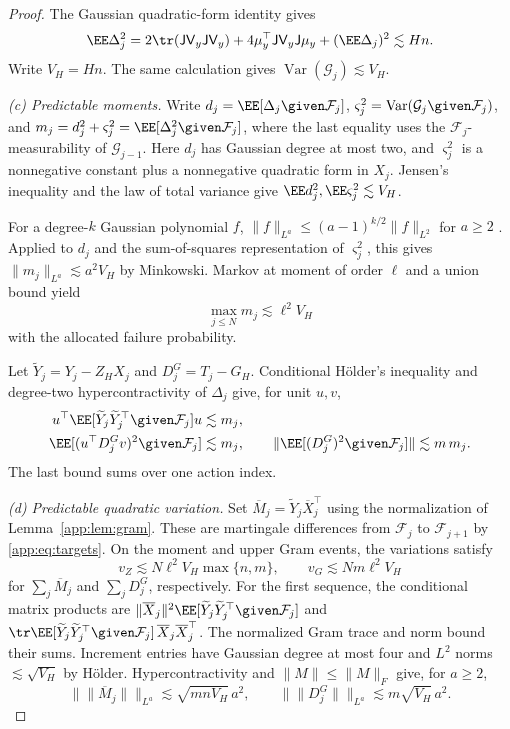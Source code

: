\begin{proof}
The Gaussian quadratic-form identity gives
\[
 \EE\Delta_j^2
 =2\tr(\mathsf J\mathsf V_y\mathsf J\mathsf V_y)
  +4\mu_y^\top\mathsf J\mathsf V_y\mathsf J\mu_y+(\EE\Delta_j)^2
 \lesssim Hn .
\]
Write $V_H=Hn$. The same calculation gives
$\operatorname{Var}(\mathcal G_j)\lesssim V_H$.

\emph{(c) Predictable moments.}
Write
$d_j=\EE[\Delta_j\given\mathcal F_j]$,
$\varsigma_j^2=\operatorname{Var}(\mathcal G_j\given\mathcal F_j)$, and
$m_j=d_j^2+\varsigma_j^2=\EE[\Delta_j^2\given\mathcal F_j]$,
where the last equality uses the $\mathcal F_j$-measurability of
$\mathcal G_{j-1}$.
Here $d_j$ has Gaussian degree at most two, and
$\varsigma_j^2$ is a nonnegative constant plus a nonnegative quadratic
form in $X_j$. Jensen's inequality and the law of total variance give
$\EE d_j^2,\EE\varsigma_j^2\lesssim V_H$.

For a degree-$k$ Gaussian polynomial $f$,
$\|f\|_{L^a}\le(a-1)^{k/2}\|f\|_{L^2}$ for $a\ge2$
\citep{nelson1973free}.
Applied to $d_j$ and the sum-of-squares representation of
$\varsigma_j^2$, this gives $\|m_j\|_{L^a}\lesssim a^2V_H$
by Minkowski. Markov at moment of order $\ell$ and a union bound yield
\begin{equation}\label{app:eq:mh}
 \max_{j\le N}m_j\lesssim\ell^2V_H
\end{equation}
with the allocated failure probability.

Let $\widetilde Y_j=Y_j-Z_HX_j$ and $D_j^G=T_j-G_H$.
Conditional H\"older's inequality and degree-two hypercontractivity
of $\Delta_j$ give, for unit $u,v$,
\[
 \begin{split}
 u^\top\EE[\widetilde Y_j\widetilde Y_j^\top\given\mathcal F_j]u
       &\lesssim m_j,\\
 \EE[(u^\top D_j^Gv)^2\given\mathcal F_j]&\lesssim m_j,\qquad
 \|\EE[(D_j^G)^2\given\mathcal F_j]\|\lesssim m\,m_j .
 \end{split}
\]
The last bound sums over one action index.

\emph{(d) Predictable quadratic variation.}
Set $\overline M_j=\widetilde Y_j\overline X_j^\top$ using the
normalization of Lemma~\ref{app:lem:gram}.
These are martingale differences from $\mathcal F_j$ to
$\mathcal F_{j+1}$ by \eqref{app:eq:targets}.
On the moment and upper Gram events, the variations satisfy
\[
 v_Z\lesssim N\ell^2V_H\max\{n,m\},\qquad
 v_G\lesssim Nm\ell^2V_H
\]
for $\sum_j\overline M_j$ and $\sum_jD_j^G$, respectively.
For the first sequence, the conditional matrix products are
$\|\overline X_j\|^2\EE[\widetilde Y_j\widetilde Y_j^\top\given\mathcal F_j]$
and
$\tr\EE[\widetilde Y_j\widetilde Y_j^\top\given\mathcal F_j]\,
\overline X_j\overline X_j^\top$.
The normalized Gram trace and norm bound their sums.
Increment entries have Gaussian degree at most four and
$L^2$ norms $\lesssim\sqrt{V_H}$ by H\"older.
Hypercontractivity and $\|M\|\le\|M\|_F$ give, for $a\ge2$,
\begin{equation}\label{app:eq:tails}
 \bigl\|\|\overline M_j\|\bigr\|_{L^a}
      \lesssim\sqrt{mnV_H}\,a^2,\qquad
 \bigl\|\|D_j^G\|\bigr\|_{L^a}
      \lesssim m\sqrt{V_H}\,a^2 .
\end{equation}


\end{proof}
